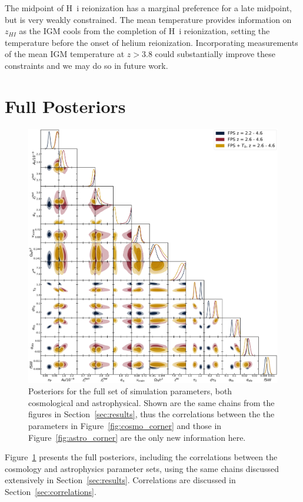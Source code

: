 The midpoint of H~{\sc i} reionization has a marginal preference for a late midpoint, but is very weakly constrained.
The mean temperature provides information on $z_{HI}$ as the IGM cools from the completion of H~{\sc i} reionization, setting the temperature before the onset of helium reionization.
Incorporating measurements of the mean IGM temperature at $z > 3.8$  \cite[e.g.~][]{2023arXiv230402038G} could substantially improve these constraints and we may do so in future work.

\section{Full Posteriors}
\label{sec:full_posteriors}
\begin{figure}
    \centering
    \includegraphics[width=\textwidth]{figures/allp_corner.pdf}
    \caption{\label{fig:full_posterior}
    Posteriors for the full set of simulation parameters, both cosmological and astrophysical.
    Shown are the same chains from the figures in Section~\ref{sec:results}, thus the correlations between the the parameters in Figure~\ref{fig:cosmo_corner} and those in Figure~\ref{fig:astro_corner} are the only new information here.
    }
\end{figure}

Figure~\ref{fig:full_posterior} presents the full posteriors, including the correlations between the cosmology and astrophysics parameter sets, using the same chains discussed extensively in Section~\ref{sec:results}.
Correlations are discussed in Section~\ref{sec:correlations}.

